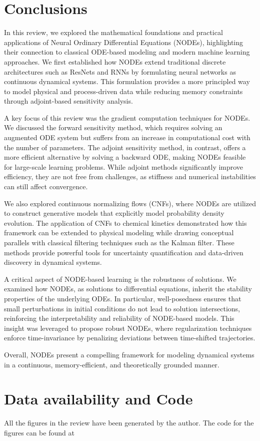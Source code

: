 \documentclass[fontsize=11pt]{article}
\theoremstyle{definition}
\begin{document}
\section{Conclusions}
In this review, we explored the mathematical foundations and practical applications 
of Neural Ordinary Differential Equations (NODEs), highlighting their connection 
to classical ODE-based modeling and modern machine learning approaches. We first 
established how NODEs extend traditional discrete architectures such as ResNets 
and RNNs by formulating neural networks as continuous dynamical systems. This 
formulation provides a more principled way to model physical and process-driven 
data while reducing memory constraints through adjoint-based sensitivity analysis.

A key focus of this review was the gradient computation techniques for NODEs. We 
discussed the forward sensitivity method, which requires solving an augmented ODE 
system but suffers from an increase in computational cost with the number of parameters. 
The adjoint sensitivity method, in contrast, offers a more efficient alternative by 
solving a backward ODE, making NODEs feasible for large-scale learning problems. While 
adjoint methods significantly improve efficiency, they are not free from challenges, 
as stiffness and numerical instabilities can still affect convergence.

We also explored continuous normalizing flows (CNFs), where NODEs are utilized to 
construct generative models that explicitly model probability density evolution. 
The application of CNFs to chemical kinetics demonstrated how this framework can 
be extended to physical modeling while drawing conceptual parallels with classical 
filtering techniques such as the Kalman filter. These methods provide powerful tools 
for uncertainty quantification and data-driven discovery in dynamical systems.

A critical aspect of NODE-based learning is the robustness of solutions. We examined 
how NODEs, as solutions to differential equations, inherit the stability properties 
of the underlying ODEs. In particular, well-posedness ensures that small perturbations 
in initial conditions do not lead to solution intersections, reinforcing the interpretability 
and reliability of NODE-based models. This insight was leveraged to propose robust NODEs, 
where regularization techniques enforce time-invariance by penalizing deviations between time-shifted trajectories.

Overall, NODEs present a compelling framework for modeling dynamical systems in a continuous, 
memory-efficient, and theoretically grounded manner. 

\section{Data availability and Code}
All the figures in the review have been generated by the author. The code for the
figures can be found at  

\newpage
\FloatBarrier


\end{document}
